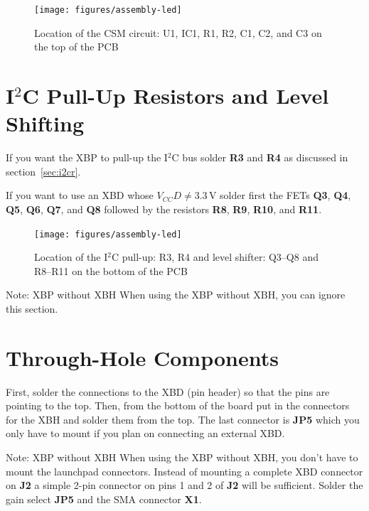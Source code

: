 \documentclass[twoside,11pt]{cergdoc}
\begin{document}
\begin{figure}[ht]
  \begin{center}
    \texttt{[image: figures/assembly-led]}
    \caption{Location of the CSM circuit: U1, IC1, R1, R2, C1, C2, and C3 on the top of the PCB}
  \end{center}
\end{figure}

\section{I$^2$C Pull-Up Resistors and Level Shifting}

If you want the XBP to pull-up the I$^2$C bus solder \textbf{R3} and \textbf{R4}
as discussed in section~\ref{sec:i2cr}. 

If you want to use an XBD whose $V_{CC}D \ne 3.3\,\mathrm{V}$ solder first the
FETs \textbf{Q3}, \textbf{Q4}, \textbf{Q5}, \textbf{Q6}, \textbf{Q7}, and \textbf{Q8}
followed by the resistors \textbf{R8}, \textbf{R9}, \textbf{R10}, and \textbf{R11}.

\begin{figure}[ht]
  \begin{center}
    \texttt{[image: figures/assembly-led]}
    \caption{Location of the I$^2$C pull-up: R3, R4 and level shifter: Q3--Q8 and R8--R11 on the bottom of the PCB}
  \end{center}
\end{figure}

\begin{cergbox}{Note: XBP without XBH}
    When using the XBP without XBH, you can ignore this section. 
\end{cergbox}

\section{Through-Hole Components}

First, solder the connections to the XBD (pin header) so that the pins are pointing
to the top. Then, from the bottom of the board put in the connectors for the XBH
and solder them from the top. The last connector is \textbf{JP5} which you only
have to mount if you plan on connecting an external XBD. 

\begin{cergbox}{Note: XBP without XBH}
    When using the XBP without XBH, you don't have to mount the
    launchpad connectors. Instead of mounting a complete XBD connector
    on \textbf{J2} a simple 2-pin connector on pins 1 and 2 of \textbf{J2}
    will be sufficient. Solder the gain select \textbf{JP5} and the 
    SMA connector \textbf{X1}. 
\end{cergbox}
\end{document}
